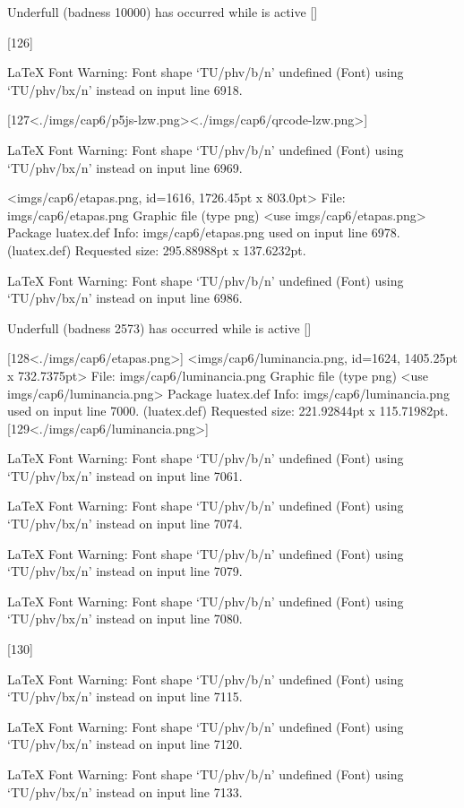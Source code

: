 Underfull \vbox (badness 10000) has occurred while \output is active []

[126]

LaTeX Font Warning: Font shape `TU/phv/b/n' undefined
(Font)              using `TU/phv/bx/n' instead on input line 6918.

[127<./imgs/cap6/p5js-lzw.png><./imgs/cap6/qrcode-lzw.png>]

LaTeX Font Warning: Font shape `TU/phv/b/n' undefined
(Font)              using `TU/phv/bx/n' instead on input line 6969.

<imgs/cap6/etapas.png, id=1616, 1726.45pt x 803.0pt>
File: imgs/cap6/etapas.png Graphic file (type png)
<use imgs/cap6/etapas.png>
Package luatex.def Info: imgs/cap6/etapas.png  used on input line 6978.
(luatex.def)             Requested size: 295.88988pt x 137.6232pt.

LaTeX Font Warning: Font shape `TU/phv/b/n' undefined
(Font)              using `TU/phv/bx/n' instead on input line 6986.


Underfull \vbox (badness 2573) has occurred while \output is active []

[128<./imgs/cap6/etapas.png>]
<imgs/cap6/luminancia.png, id=1624, 1405.25pt x 732.7375pt>
File: imgs/cap6/luminancia.png Graphic file (type png)
<use imgs/cap6/luminancia.png>
Package luatex.def Info: imgs/cap6/luminancia.png  used on input line 7000.
(luatex.def)             Requested size: 221.92844pt x 115.71982pt.
[129<./imgs/cap6/luminancia.png>]

LaTeX Font Warning: Font shape `TU/phv/b/n' undefined
(Font)              using `TU/phv/bx/n' instead on input line 7061.


LaTeX Font Warning: Font shape `TU/phv/b/n' undefined
(Font)              using `TU/phv/bx/n' instead on input line 7074.


LaTeX Font Warning: Font shape `TU/phv/b/n' undefined
(Font)              using `TU/phv/bx/n' instead on input line 7079.


LaTeX Font Warning: Font shape `TU/phv/b/n' undefined
(Font)              using `TU/phv/bx/n' instead on input line 7080.

[130]

LaTeX Font Warning: Font shape `TU/phv/b/n' undefined
(Font)              using `TU/phv/bx/n' instead on input line 7115.


LaTeX Font Warning: Font shape `TU/phv/b/n' undefined
(Font)              using `TU/phv/bx/n' instead on input line 7120.


LaTeX Font Warning: Font shape `TU/phv/b/n' undefined
(Font)              using `TU/phv/bx/n' instead on input line 7133.


